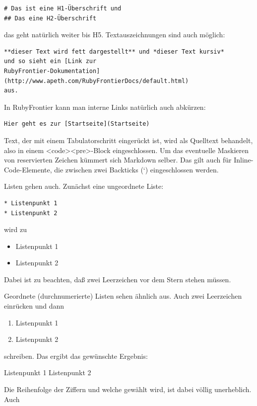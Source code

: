 \documentclass[11pt]{report}
\begin{document}
\begin{verbatim}
# Das ist eine H1-Überschrift und
## Das eine H2-Überschrift
\end{verbatim}

das geht natürlich weiter bis H5. Textauszeichnungen sind auch möglich:


\begin{verbatim}
**dieser Text wird fett dargestellt** und *dieser Text kursiv*
und so sieht ein [Link zur
RubyFrontier-Dokumentation](http://www.apeth.com/RubyFrontierDocs/default.html)
aus.
\end{verbatim}

In RubyFrontier kann man interne Links natürlich auch abkürzen:


\begin{verbatim}
Hier geht es zur [Startseite](Startseite)
\end{verbatim}

Text, der mit einem Tabulatorschritt eingerückt ist, wird als
Quelltext behandelt, also in einem <code><pre>-Block
eingeschlossen. Um das eventuelle Maskieren von reservierten Zeichen
kümmert sich Markdown selber. Das gilt auch für Inline-Code-Elemente,
die zwischen zwei Backticks (`) eingeschlossen werden.


Listen gehen auch. Zunächst eine ungeordnete Liste:


\begin{verbatim}
* Listenpunkt 1
* Listenpunkt 2
\end{verbatim}

wird zu

\begin{itemize}
\item Listenpunkt 1
\item Listenpunkt 2
\end{itemize}

Dabei ist zu beachten, daß zwei Leerzeichen vor dem Stern stehen müssen.

Geordnete (durchnumerierte) Listen sehen ähnlich aus. Auch zwei
Leerzeichen einrücken und dann


\begin{enumerate}
\item Listenpunkt 1
\item Listenpunkt 2
\end{enumerate}

schreiben. Das ergibt das gewünschte Ergebnis:


Listenpunkt 1
Listenpunkt 2

Die Reihenfolge der Ziffern und welche gewählt wird, ist dabei völlig
unerheblich. Auch
\end{document}
